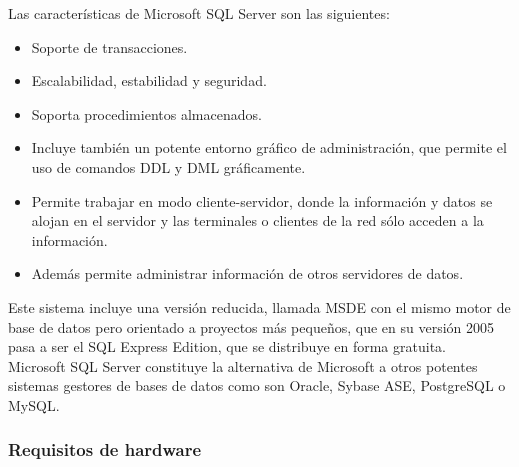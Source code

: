	Las caracter\'isticas de Microsoft SQL Server son las siguientes:
	\begin{itemize}
		\item Soporte de transacciones.
		\item Escalabilidad, estabilidad y seguridad.
		\item Soporta procedimientos almacenados.
		\item Incluye tambi\'en un potente entorno gr\'afico de administraci\'on, que permite el uso de comandos DDL y DML gr\'aficamente.
		\item Permite trabajar en modo cliente-servidor, donde la informaci\'on y datos se alojan en el servidor y las terminales o clientes de la red s\'olo acceden a la informaci\'on.
		\item Adem\'as permite administrar informaci\'on de otros servidores de datos.
	\end{itemize}

	Este sistema incluye una versi\'on reducida, llamada MSDE con el mismo motor de base de datos pero orientado a proyectos m\'as peque\~nos, que en su versi\'on 2005 pasa a ser el SQL Express Edition, que se distribuye en forma gratuita. \\

	Microsoft SQL Server constituye la alternativa de Microsoft a otros potentes sistemas gestores de bases de datos como son Oracle, Sybase ASE, PostgreSQL o MySQL.

		\subsubsection{Requisitos de hardware}

